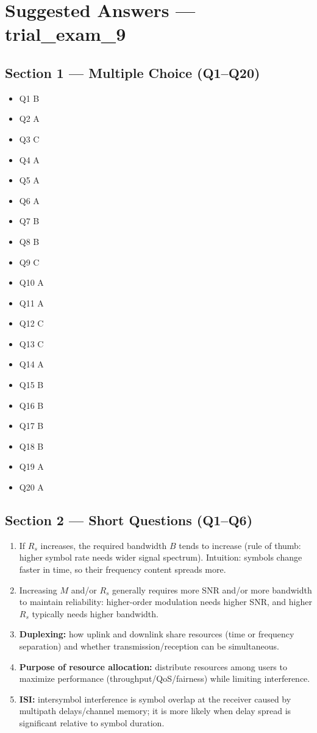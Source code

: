 \documentclass[11pt,a4paper]{article}
\begin{document}
\section*{Suggested Answers --- trial\_exam\_9}

\subsection*{Section 1 --- Multiple Choice (Q1--Q20)}
\begin{itemize}
    \item Q1 B
    \item Q2 A
    \item Q3 C
    \item Q4 A
    \item Q5 A
    \item Q6 A
    \item Q7 B
    \item Q8 B
    \item Q9 C
    \item Q10 A
    \item Q11 A
    \item Q12 C
    \item Q13 C
    \item Q14 A
    \item Q15 B
    \item Q16 B
    \item Q17 B
    \item Q18 B
    \item Q19 A
    \item Q20 A
\end{itemize}

\subsection*{Section 2 --- Short Questions (Q1--Q6)}
\begin{enumerate}[label=\arabic*.]
    \item If $R_s$ increases, the required bandwidth $B$ tends to increase (rule of thumb: higher symbol rate needs wider signal spectrum). Intuition: symbols change faster in time, so their frequency content spreads more.
    \item Increasing $M$ and/or $R_s$ generally requires more SNR and/or more bandwidth to maintain reliability: higher-order modulation needs higher SNR, and higher $R_s$ typically needs higher bandwidth.
    \item \textbf{Duplexing:} how uplink and downlink share resources (time or frequency separation) and whether transmission/reception can be simultaneous.
    \item \textbf{Purpose of resource allocation:} distribute resources among users to maximize performance (throughput/QoS/fairness) while limiting interference.
    \item \textbf{ISI:} intersymbol interference is symbol overlap at the receiver caused by multipath delays/channel memory; it is more likely when delay spread is significant relative to symbol duration.
    
\end{enumerate}
\end{document}
